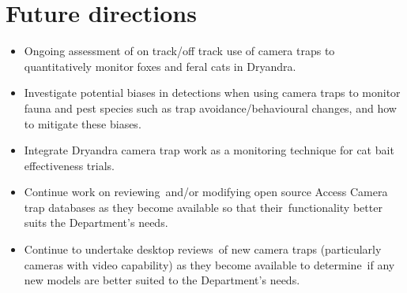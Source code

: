 \documentclass[version=last,
    paper=a4, %
    10pt, %
    usenames,
    dvipsnames,
    oneside, %
    headings=openany, %
    DIV=15 %
]{scrbook}
\begin{document}
\section*{Future directions}
\begin{itemize}
\itemsep1pt\parskip0pt
\item
  Ongoing assessment of on track/off track use of camera traps to
  quantitatively monitor foxes and feral cats in Dryandra.
\item
  Investigate potential biases in detections when using camera traps to
  monitor fauna and pest species such as trap avoidance/behavioural
  changes, and how to mitigate these biases.
\item
  Integrate Dryandra camera trap work as a monitoring technique for cat
  bait effectiveness trials.
\item
  Continue work on reviewing~and/or modifying open source Access Camera
  trap databases as they become available so that their~functionality
  better suits the Department's needs.
\item
  Continue to undertake desktop reviews~of new camera traps
  (particularly cameras with video capability) as they become available
  to determine~if any new models are better suited to the Department's
  needs.
\end{itemize}



\end{document}
